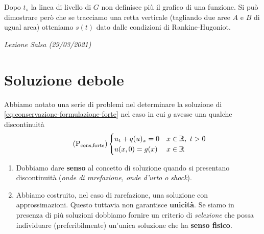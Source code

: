 \documentclass[10pt,a4paper,twoside,openright]{book}
\newcounter{conteggioS}
\newcommand{\LezioneS}[1]{
	\stepcounter{conteggioS}
	\textit{Lezione Salsa \arabic{conteggioS} (#1)}
	}
\begin{document}
Dopo $\displaystyle t_{s}$ la linea di livello di $G$ non definisce più il grafico di una funzione.
Si può dimostrare però che se tracciamo una retta verticale (tagliando due aree $A$ e $B$ di ugual area) otteniamo $\displaystyle s(t)$ dato dalle condizioni di Rankine-Hugoniot.


\LezioneS{29/03/2021}
\section{Soluzione debole}

Abbiamo notato una serie di problemi nel determinare la soluzione di \eqref{eq:conservazione-formulazione-forte} nel caso in cui $g$ avesse una qualche discontinuità
\begin{equation}
	\tag{P$_{\text{cons,forte}}$}
	\begin{cases}
		u_{t} +q(u)_{x} =0 & x\in \mathbb{R} ,\ t >0 \\
		u(x,0) =g(x)      & x\in \mathbb{R}         
	\end{cases}
	\label{eq:conservazione-formulazione-forte}
\end{equation}
\begin{enumerate}
	\item Dobbiamo dare \textbf{senso} al concetto di soluzione quando si presentano discontinuità (\textit{onde di rarefazione, onde d'urto o shock}).
	\item Abbiamo costruito, nel caso di rarefazione, una soluzione con approssimazioni. Questo tuttavia non garantisce \textbf{unicità}. Se siamo in presenza di più soluzioni dobbiamo fornire un criterio di \textit{selezione} che possa individuare (preferibilmente) un'unica soluzione che ha \textbf{senso fisico}.
\end{enumerate}
\end{document}
